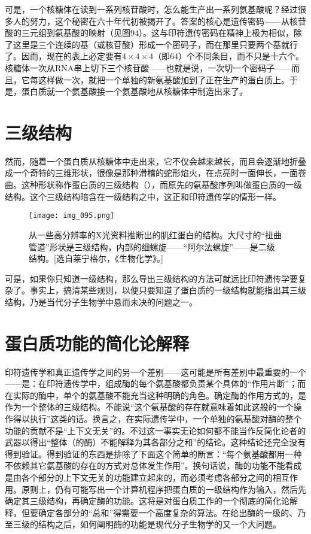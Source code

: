 \setlength\lwindowsep{\ccwd}
\setlength\rwindowsep{\lwindowsep}
\begin{window}
可是，一个核糖体在读到一系列核苷酸时，怎么能生产出一系列氨基酸呢？经过很多人的努力，这个秘密在六十年代初被揭开了。答案的核心是遗传密码——从核苷酸的三元组到氨基酸的映射（见图$94$）。这与印符遗传密码在精神上极为相似，除了这里是三个连续的基（或核苷酸）形成一个密码子，而在那里只要两个基就行了。因而，现在的表上必定要有$4\times4\times4$（即$64$）个不同条目，而不只是十六个。核糖体一次从RNA串上切下三个核苷酸——也就是说，一次切一个密码子——而且，它每这样做一次，就把一个单独的新氨基酸加到了正在生产的蛋白质上。于是，蛋白质就一个氨基酸接一个氨基酸地从核糖体中制造出来了。
\end{window}

\section{三级结构}

然而，随着一个蛋白质从核糖体中走出来，它不仅会越来越长，而且会逐渐地折叠成一个奇特的三维形状，很像是那种滑稽的蛇形焰火，在点亮时一面伸长，一面卷曲。这种形状称作蛋白质的三级结构（），而原先的氨基酸序列叫做蛋白质的一级结构。这个三级结构暗含在一级结构之中，这正和印符遗传学的情形一样。

\begin{figure}
\texttt{[image: img\_095.png]}
\caption[肌红蛋白的二级和三级结构。]
  {从一些高分辨率的X光资料推断出的肌红蛋白的结构。大尺寸的“扭曲管道”形状是三级结构，内部的细螺旋——“阿尔法螺旋”——是二级结构。[选自莱宁格尔，《生物化学》。]}
\end{figure}

可是，如果你只知道一级结构，那么导出三级结构的方法可就远比印符遗传学要复杂了。事实上，搞清某些规则，以便只要知道了蛋白质的一级结构就能指出其三级结构，乃是当代分子生物学中悬而未决的问题之一。

\section{蛋白质功能的简化论解释}

印符遗传学和真正遗传学之间的另一个差别——这可能是所有差别中最重要的一个——是：在印符遗传学中，组成酶的每个氨基酸都负责某个具体的“作用片断”；而在实际的酶中，单个的氨基酸不能充当这种明确的角色。确定酶的作用方式的，是作为一个整体的三级结构。不能说“这个氨基酸的存在就意味着如此这般的一个操作得以执行”这类的话。换言之，在实际遗传学中，一个单独的氨基酸对酶的整个功能的贡献不是“上下文无关”的。不过这一事实无论如何都不能当作反简化论者的武器以得出“整体（的酶）不能解释为其各部分之和”的结论。这种结论还完全没有得到验证。得到验证的东西是排除了下面这个简单的断言：“每个氨基酸都用一种不依赖其它氨基酸的存在的方式对总体发生作用”。换句话说，酶的功能不能看成是由各个部分的上下文无关的功能建立起来的，而必须考虑各部分之间的相互作用。原则上，仍有可能写出一个计算机程序把蛋白质的一级结构作为输入，然后先确定其三级结构，再确定酶的功能。这将是对蛋白质工作的一个彻底的简化论解释，但要确定各部分的“总和”得需要一个高度复杂的算法。在给出酶的一级的、乃至三级的结构之后，如何阐明酶的功能是现代分子生物学的又一个大问题。

